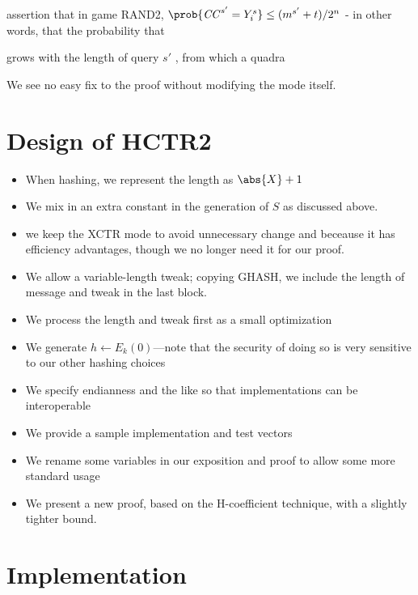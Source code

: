 \documentclass[letterpaper,11pt]{article}
\begin{document}
assertion that in game RAND2, 
\(\prob{\mathit{CC}^{s'} = Y_i^s} \leq (m^{s'} + t)/2^n\) - in
other words, that the probability that


grows with the length of query \(s'\)
, from
which a quadra

We see no easy fix to the proof
without modifying the mode itself.

\section{Design of HCTR2}
\begin{itemize}
    \item When hashing, we represent the length as \(\abs{X} + 1\)
    \item We mix in an extra constant in the generation of \(S\) as discussed above.
    \item we keep the XCTR mode to avoid unnecessary change and beceause it has efficiency
    advantages, though we no longer need it for our proof.
    \item We allow a variable-length tweak; copying GHASH\cite{gcm}, 
    we include the length of message and tweak in the last block. 
    \item We process the length and tweak first as a small optimization
    \item We generate \(h \gets E_k(0)\)---note that the security of doing so is very sensitive to our other hashing choices
    \item We specify endianness and the like so that implementations can be interoperable
    \item We provide a sample implementation and test vectors
    \item We rename some variables in our exposition and proof to allow some more standard usage
    \item We present a new proof, based on the H-coefficient technique, with a slightly tighter bound.
\end{itemize}

\section{Implementation}



\printbibliography[heading=bibintoc]
\end{document}
